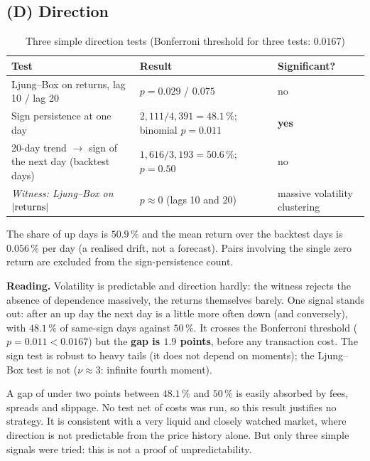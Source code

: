 \documentclass[12pt,a4paper]{article}
\begin{document}
\subsection{(D) Direction}

\begin{table}[H]
	\centering
	\small
	\caption{Three simple direction tests (Bonferroni threshold for three tests: $0.0167$)}
	\label{tab:bm-direction}
	\begin{tabular}{p{5cm}p{5.3cm}p{3.1cm}}
		\toprule
		Test & Result & Significant? \\
		\midrule
		Ljung--Box on returns, lag 10 / lag 20 & $p=0.029$ / $0.075$ & no \\
		Sign persistence at one day & $2{,}111/4{,}391=48.1\,\%$; binomial $p=0.011$ & \textbf{yes} \\
		20-day trend $\to$ sign of the next day (backtest days) & $1{,}616/3{,}193=50.6\,\%$; $p=0.50$ & no \\
		\emph{Witness: Ljung--Box on $|{\rm returns}|$} & $p\approx0$ (lags 10 and 20) & massive volatility clustering \\
		\bottomrule
	\end{tabular}
\end{table}

The share of up days is $50.9\,\%$ and the mean return over the backtest days is $0.056\,\%$ per day (a realised drift, not a forecast). Pairs involving the single zero return are excluded from the sign-persistence count.

\textbf{Reading.} Volatility is predictable and direction hardly: the witness rejects the absence of dependence massively, the returns themselves barely. One signal stands out: after an up day the next day is a little more often down (and conversely), with $48.1\,\%$ of same-sign days against $50\,\%$. It crosses the Bonferroni threshold ($p=0.011<0.0167$) but the \textbf{gap is $1.9$ points}, before any transaction cost. The sign test is robust to heavy tails (it does not depend on moments); the Ljung--Box test is not ($\nu\approx3$: infinite fourth moment).

\begin{econbox}
	A gap of under two points between $48.1\,\%$ and $50\,\%$ is easily absorbed by fees, spreads and slippage. No test net of costs was run, so this result justifies no strategy. It is consistent with a very liquid and closely watched market, where direction is not predictable from the price history alone. But only three simple signals were tried: this is not a proof of unpredictability.
\end{econbox}
\end{document}

